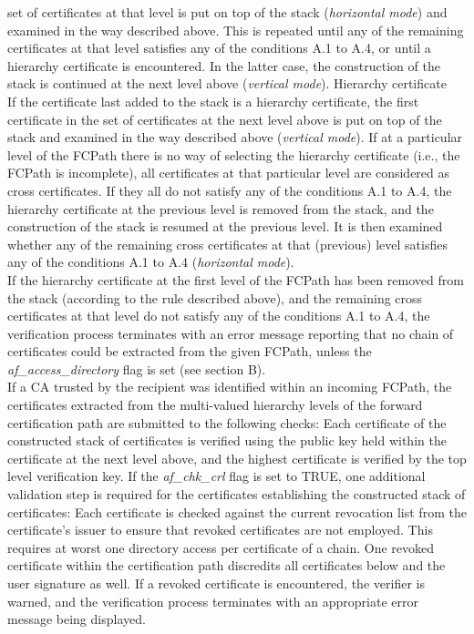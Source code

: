 set of certificates at that level is put on top of the stack 
({\em horizontal mode}) and examined in the way described above.
This is repeated until any of the remaining certificates at that level satisfies 
any of the conditions A.1 to A.4, or until a hierarchy certificate is encountered. 
In the latter case, the construction of the stack is continued at the next level 
above ({\em vertical mode}).
\m Hierarchy certificate \\
If the certificate last added to the stack is
a hierarchy certificate, the first certificate in the set of certificates at
the next level above is put on top of the stack and examined in the way
described above ({\em vertical mode}).
\ei
If at a particular level of the FCPath there is no way of selecting
the hierarchy certificate (i.e., the FCPath is incomplete), all certificates at 
that particular level are considered as cross certificates. If they all do not 
satisfy any of the conditions A.1 to A.4, the hierarchy certificate at the previous level 
is removed from the stack, and the construction of the stack is resumed at
the previous level.
It is then examined whether any of the remaining cross certificates at that 
(previous) level satisfies any of the conditions A.1 to A.4 ({\em horizontal mode}).
\\ [1em]
If the hierarchy certificate at the first level of the FCPath has been 
removed from the stack (according to the rule described above), and 
the remaining cross certificates at that level do not satisfy any of the conditions A.1 to A.4, 
the verification process terminates with an error message reporting that 
no chain of certificates could be extracted from the given FCPath, unless
the {\em af\_access\_directory} flag is set (see section B).
\\ [1em]
If a CA trusted by the recipient was identified within an incoming FCPath, the certificates
extracted from the multi-valued hierarchy levels of the forward certification path are
submitted to the following checks:
\bi
\m Each certificate of the constructed stack of certificates is verified using the public 
key held within the
certificate at the next level above, and the highest certificate is  
verified by the top level verification key.
\m If the {\em af\_chk\_crl} flag is set to TRUE, one additional validation step
is required for the certificates establishing the constructed stack of certificates: 
Each certificate is checked against the current revocation list from the 
certificate's issuer to ensure that revoked certificates are not employed. 
This requires at worst one directory access per certificate of a chain. One 
revoked certificate within the certification path discredits all certificates 
below and the user signature as well. If a revoked certificate is encountered,
the verifier is warned, and the verification process terminates with an 
appropriate error message being displayed. \\ [1em]
\ei

